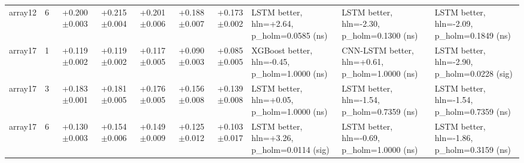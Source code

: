 \begin{table}[t]
\begin{tabular}{ll rrrrr lll}
    array12 & 6 & +0.200$\pm$0.003 & +0.215$\pm$0.004 & +0.201$\pm$0.006 & +0.188$\pm$0.007 & +0.173$\pm$0.002 & LSTM better, hln=+2.64, p\_holm=0.0585 (ns) & LSTM better, hln=-2.30, p\_holm=0.1300 (ns) & LSTM better, hln=-2.09, p\_holm=0.1849 (ns) \\
    array17 & 1 & +0.119$\pm$0.002 & +0.119$\pm$0.002 & +0.117$\pm$0.005 & +0.090$\pm$0.003 & +0.085$\pm$0.005 & XGBoost better, hln=-0.45, p\_holm=1.0000 (ns) & CNN-LSTM better, hln=+0.61, p\_holm=1.0000 (ns) & LSTM better, hln=-2.90, p\_holm=0.0228 (sig) \\
    array17 & 3 & +0.183$\pm$0.001 & +0.181$\pm$0.005 & +0.176$\pm$0.005 & +0.156$\pm$0.008 & +0.139$\pm$0.008 & LSTM better, hln=+0.05, p\_holm=1.0000 (ns) & LSTM better, hln=-1.54, p\_holm=0.7359 (ns) & LSTM better, hln=-1.54, p\_holm=0.7359 (ns) \\
    array17 & 6 & +0.130$\pm$0.003 & +0.154$\pm$0.006 & +0.149$\pm$0.009 & +0.125$\pm$0.012 & +0.103$\pm$0.017 & LSTM better, hln=+3.26, p\_holm=0.0114 (sig) & LSTM better, hln=-0.69, p\_holm=1.0000 (ns) & LSTM better, hln=-1.86, p\_holm=0.3159 (ns) \\
    \bottomrule
  \end{tabular}
\end{table}
